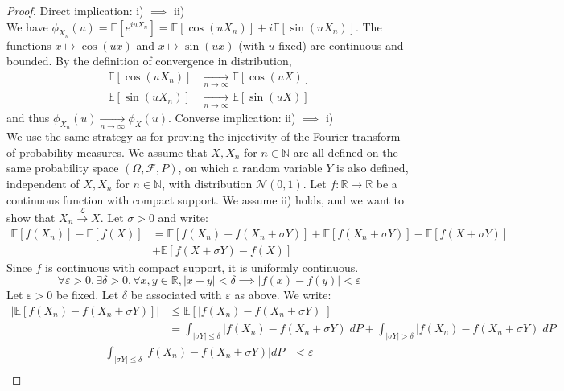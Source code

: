 \begin{proof}
Direct implication: i) $\implies$ ii) \\
We have $\phi_{X_n}(u) = \mathbb{E}[e^{iuX_n}] = \mathbb{E}[\cos(uX_n)] + i\mathbb{E}[\sin(uX_n)]$. The functions $x \mapsto \cos(ux)$ and $x \mapsto \sin(ux)$ (with $u$ fixed) are continuous and bounded. By the definition of convergence in distribution,
\begin{align*}
    \mathbb{E}[\cos(uX_n)] &\xrightarrow[n \to \infty]{} \mathbb{E}[\cos(uX)] \\
    \mathbb{E}[\sin(uX_n)] &\xrightarrow[n \to \infty]{} \mathbb{E}[\sin(uX)]
\end{align*}
and thus $\phi_{X_n}(u) \xrightarrow[n \to \infty]{} \phi_X(u)$.
\vspace{1cm}
Converse implication: ii) $\implies$ i) \\
We use the same strategy as for proving the injectivity of the Fourier transform of probability measures. We assume that $X, X_n$ for $n \in \mathbb{N}$ are all defined on the same probability space $(\Omega, \mathcal{F}, P)$, on which a random variable $Y$ is also defined, independent of $X, X_n$ for $n \in \mathbb{N}$, with distribution $\mathcal{N}(0,1)$. Let $f: \mathbb{R} \to \mathbb{R}$ be a continuous function with compact support. We assume ii) holds, and we want to show that $X_n \xrightarrow{\mathcal{L}} X$. Let $\sigma > 0$ and write:
\begin{align*}
    \mathbb{E}[f(X_n)] - \mathbb{E}[f(X)] &= \mathbb{E}[f(X_n) - f(X_n + \sigma Y)] + \mathbb{E}[f(X_n + \sigma Y)] - \mathbb{E}[f(X + \sigma Y)] \\
    &+ \mathbb{E}[f(X + \sigma Y) - f(X)]
\end{align*}
Since $f$ is continuous with compact support, it is uniformly continuous.
\[
\forall \varepsilon > 0, \exists \delta > 0, \forall x,y \in \mathbb{R}, |x-y| < \delta \implies |f(x) - f(y)| < \varepsilon
\]
Let $\varepsilon > 0$ be fixed. Let $\delta$ be associated with $\varepsilon$ as above. We write:
\begin{align*}
    |\mathbb{E}[f(X_n) - f(X_n + \sigma Y)]| &\leq \mathbb{E}[|f(X_n) - f(X_n + \sigma Y)|] \\
    &= \int_{|\sigma Y| \leq \delta} |f(X_n) - f(X_n + \sigma Y)| dP + \int_{|\sigma Y| > \delta} |f(X_n) - f(X_n + \sigma Y)| dP
\end{align*}
\begin{align*}
    \int_{|\sigma Y| \leq \delta} |f(X_n) - f(X_n + \sigma Y)| dP &< \varepsilon \\

\end{align*}
\end{proof}
